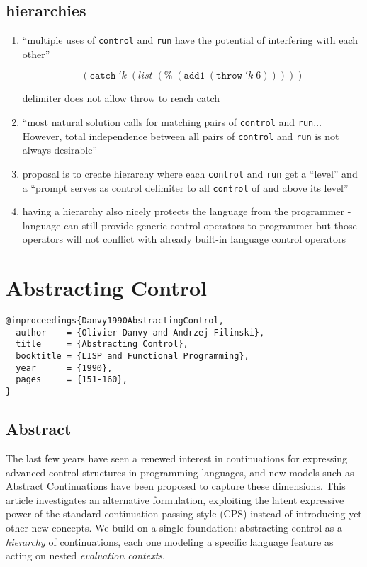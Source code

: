 \documentclass[letterpaper]{llncs}
\newcommand{\app}[2]{ \ensuremath{ #1 \; #2 } }
\newcommand{\appp}[2]{ \ensuremath{ (\app{#1}{#2}) } }
\newcommand{\createop}[1]{\texttt{#1}\xspace}
\newcommand{\ctrl}{\createop{control}}
\newcommand{\run}{\createop{run}}
\newcommand{\throw}{\createop{throw}}
\newcommand{\catch}{\createop{catch}}
\newcommand{\addone}{\createop{add1}}
\begin{document}
\subsection*{hierarchies}
\begin{enumerate}
	\item ``multiple uses of \ctrl and \run have the potential of interfering with each other''
	
	$$\appp{ \catch }{ \app{ 'k }{ \appp{list}{ \appp{\%}{ \appp{\addone}{ \appp{\throw}{ \app{'k}{6} } } } } } }$$
	
	delimiter does not allow throw to reach catch
	\item ``most natural solution calls for matching pairs of \ctrl and \run $\ldots$ However, total independence between all pairs of \ctrl and \run is not always desirable''
	\item proposal is to create hierarchy where each \ctrl and \run get a ``level'' and a ``prompt serves as control delimiter to all \ctrl of and above its level''
	\item having a hierarchy also nicely protects the language from the programmer - language can still provide generic control operators to programmer but those operators will not conflict with already built-in language control operators
	
\end{enumerate}


\section*{Abstracting Control}%

\begin{verbatim}
@inproceedings{Danvy1990AbstractingControl,
  author    = {Olivier Danvy and Andrzej Filinski},
  title     = {Abstracting Control},
  booktitle = {LISP and Functional Programming},
  year      = {1990},
  pages     = {151-160},
}
\end{verbatim}


\subsection*{Abstract}
The last few years have seen a renewed interest in continuations for expressing advanced control structures in programming languages, and new models such as Abstract Continuations have been proposed to capture these dimensions. This article investigates an alternative formulation, exploiting the latent expressive power of the standard continuation-passing style (CPS) instead of introducing yet other new concepts. We build on a single foundation: abstracting control as a \textit{hierarchy} of continuations, each one modeling a specific language feature as acting on nested \textit{evaluation contexts}. 
\end{document}
